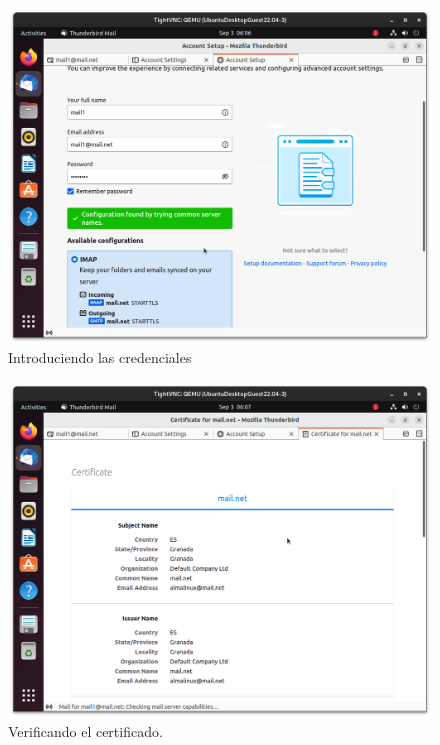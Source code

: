 \begin{figure}[H]
	\centering
	\includegraphics[scale=0.30]{15}
	\caption{Introduciendo las credenciales}
\end{figure}

\begin{figure}[H]
	\centering
	\includegraphics[scale=0.30]{16}
	\caption{Verificando el certificado.}
\end{figure}

